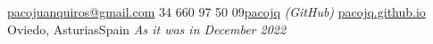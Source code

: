 \documentclass[10pt,a4paper]{article} %
\begin{document}
 



\noindent\href{mailto:pacojuanquiros@gmail.com}{pacojuanquiros@gmail.com}\bull %
\textsmaller{+}34 660 97 50 09\bull \href{http://www.github.com/pacojq}{pacojq} \textit{(GitHub)}\bull %
\href{http://pacojq.github.io}{pacojq.github.io} \\ %
Oviedo, Asturias\bull Spain \bull \textit{As it was in December 2022}%

\spacedhrule{0.9em}{-0.4em} %







\end{document}
